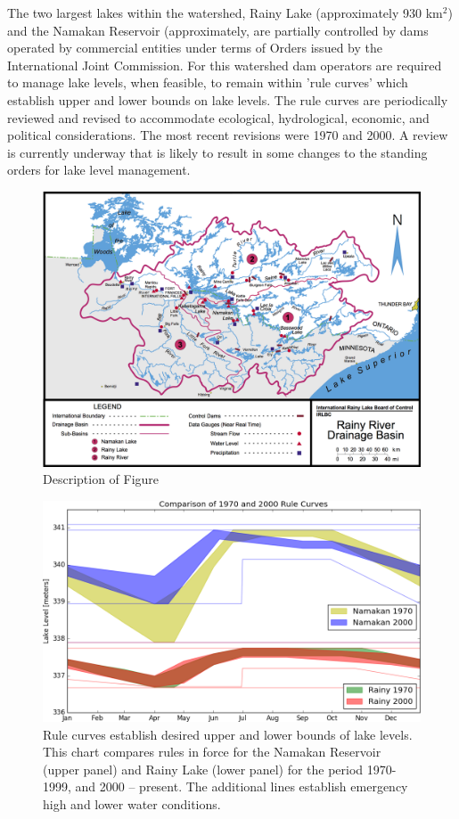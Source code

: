 \documentclass[preprint,times]{elsarticle}
\begin{document}
The two largest lakes within the watershed, Rainy Lake (approximately 930 km$^2$) and the Namakan Reservoir (approximately, are partially controlled by dams operated by commercial entities under terms of Orders issued by the International Joint Commission. For this watershed dam operators are required to manage lake levels, when feasible, to remain within 'rule curves' which establish upper and lower bounds on lake levels. The rule curves are periodically reviewed and revised to accommodate ecological, hydrological, economic, and political considerations. The most recent revisions were 1970 and 2000. A review is currently underway that is likely to result in some changes to the standing orders for lake level management.

\begin{figure}
\includegraphics[width=\linewidth]{rl_basinmap.png}
\caption{Description of Figure}\label{figure:2}
\end{figure}

\begin{figure}
\includegraphics[width=\linewidth]{RuleCurveComparison.png}
\caption{Rule curves establish desired upper and lower bounds of lake levels. This chart compares rules in force for the Namakan Reservoir (upper panel) and Rainy Lake (lower panel) for the period 1970-1999, and 2000 -- present. The additional lines establish emergency high and lower water conditions.} \label{figure:3}
\end{figure}
\end{document}
